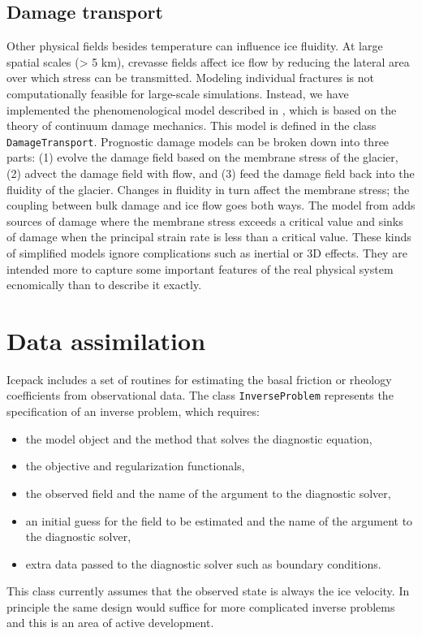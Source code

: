 \documentclass[journal abbreviation, manuscript]{copernicus}
\begin{document}
\subsection{Damage transport} \label{sec:damage-transport}

Other physical fields besides temperature can influence ice fluidity.
At large spatial scales (> 5 km), crevasse fields affect ice flow by reducing the lateral area over which stress can be transmitted.
Modeling individual fractures is not computationally feasible for large-scale simulations.
Instead, we have implemented the phenomenological model described in \citet{albrecht2014fracture}, which is based on the theory of continuum damage mechanics.
This model is defined in the class \texttt{DamageTransport}.
Prognostic damage models can be broken down into three parts: (1) evolve the damage field based on the membrane stress of the glacier, (2) advect the damage field with flow, and (3) feed the damage field back into the fluidity of the glacier.
Changes in fluidity in turn affect the membrane stress; the coupling between bulk damage and ice flow goes both ways.
The model from \citet{albrecht2014fracture} adds sources of damage where the membrane stress exceeds a critical value and sinks of damage when the principal strain rate is less than a critical value.
These kinds of simplified models ignore complications such as inertial or 3D effects.
They are intended more to capture some important features of the real physical system ecnomically than to describe it exactly.


\section{Data assimilation}

Icepack includes a set of routines for estimating the basal friction or rheology coefficients from observational data.
The class \texttt{InverseProblem} represents the specification of an inverse problem, which requires:
\begin{itemize}
    \item the model object and the method that solves the diagnostic equation,
    \item the objective and regularization functionals,
    \item the observed field and the name of the argument to the diagnostic solver,
    \item an initial guess for the field to be estimated and the name of the argument to the diagnostic solver,
    \item extra data passed to the diagnostic solver such as boundary conditions.
\end{itemize}
This class currently assumes that the observed state is always the ice velocity.
In principle the same design would suffice for more complicated inverse problems and this is an area of active development.
\end{document}
